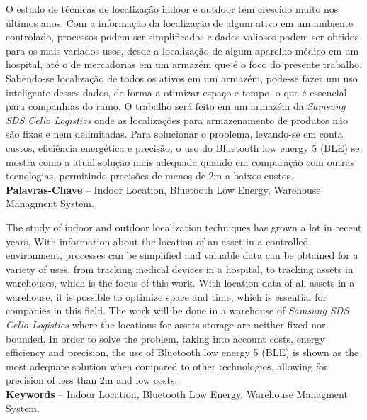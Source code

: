 \begin{resumo}
O estudo de técnicas de localização indoor e outdoor tem crescido muito nos últimos anos. Com a informação da localização de algum ativo em um ambiente controlado, processos podem ser simplificados e dados valiosos podem ser obtidos para os mais variados usos, desde a localização de algum aparelho médico em um hospital, até o de mercadorias em um armazém que é o foco do presente trabalho. Sabendo-se localização de todos os ativos em um armazém, pode-se fazer um uso inteligente desses dados, de forma a otimizar espaço e tempo, o que é essencial para companhias do ramo.
O trabalho será feito em um armazém da \textit{Samsung SDS Cello Logistics} onde as localizações para armazenamento de produtos não são fixas e nem delimitadas. Para solucionar o problema, levando-se em conta custos, eficiência energética e precisão, o uso do Bluetooth low energy 5 (BLE) se mostra como a atual solução mais adequada quando em comparação com outras tecnologias, permitindo precisões de menos de 2m a baixos custos.
%
\\[3\baselineskip]
%
\textbf{Palavras-Chave} -- Indoor Location, Bluetooth Low Energy, Warehouse Managment System.
\end{resumo}


\begin{resumo}[Abstract]
The study of indoor and outdoor localization techniques has grown a lot in recent years. With information about the location of an asset in a controlled environment, processes can be simplified and valuable data can be obtained for a variety of uses, from tracking medical devices in a hospital, to tracking assets in warehouses, which is the focus of this work. With location data of all assets in a warehouse, it is possible to optimize space and time, which is essential for companies in this field.
The work will be done in a warehouse of \textit{Samsung SDS Cello Logistics} where the locations for assets storage are neither fixed nor bounded. In order to solve the problem, taking into account costs, energy efficiency and precision, the use of Bluetooth low energy 5 (BLE) is shown as the most adequate solution when compared to other technologies, allowing for precision of less than 2m and low costs.
%
\\[3\baselineskip]
%
\textbf{Keywords} -- Indoor Location, Bluetooth Low Energy, Warehouse Managment System.
\end{resumo}
